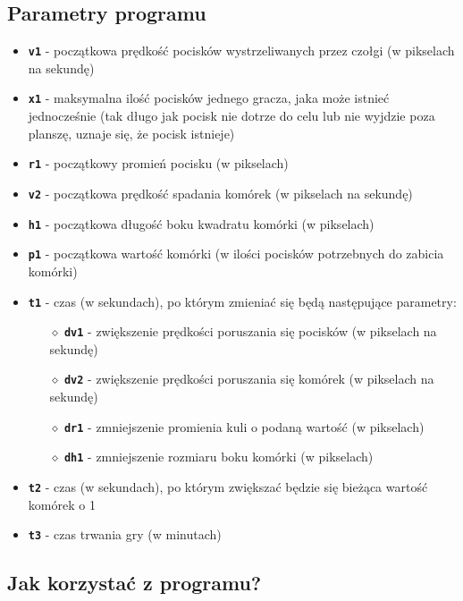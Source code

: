 \documentclass[a4paper]{article}
\begin{document}
\subsection{Parametry programu}
\begin{itemize}
    \item \texttt{\textbf{v1}} - pocz\k{a}tkowa pr\k{e}dko\'s\'c pocisk\'ow wystrzeliwanych przez czo\l{}gi (w pikselach na sekund\k{e})
    \item \texttt{\textbf{x1}} - maksymalna ilość pocisk\'ow jednego gracza, jaka mo\.ze istnie\'c jednocze\'snie (tak długo jak pocisk nie dotrze do celu lub nie wyjdzie poza planszę, uznaje się, że pocisk istnieje)
    \item \texttt{\textbf{r1}} - pocz\k{a}tkowy promie\'n pocisku (w pikselach)
    \item \texttt{\textbf{v2}} - pocz\k{a}tkowa prędko\'s\'c spadania kom\'orek (w pikselach na sekund\k{e})
    \item \texttt{\textbf{h1}} - pocz\k{a}tkowa długo\'s\'c boku kwadratu kom\'orki (w pikselach)
    \item \texttt{\textbf{p1}} - pocz\k{a}tkowa warto\'s\'c kom\'orki (w ilo\'sci pocisk\'ow potrzebnych do zabicia kom\'orki)
    \item \texttt{\textbf{t1}} - czas (w sekundach), po kt\'orym zmienia\'c si\k{e} b\k{e}d\k{a} nast\k{e}puj\k{a}ce parametry:
    \begin{itemize}
        \item[$\diamond$] \texttt{\textbf{dv1}} - zwi\k{e}kszenie pr\k{e}dko\'sci poruszania si\k{e} pocisk\'ow (w pikselach na sekund\k{e})
        \item[$\diamond$] \texttt{\textbf{dv2}} - zwi\k{e}kszenie pr\k{e}dko\'sci poruszania si\k{e} kom\'orek (w pikselach na sekund\k{e}) 
        \item[$\diamond$] \texttt{\textbf{dr1}} - zmniejszenie promienia kuli o podan\k{a} warto\'s\'c (w pikselach)
        \item[$\diamond$] \texttt{\textbf{dh1}} - zmniejszenie rozmiaru boku kom\'orki (w pikselach)
    \end{itemize}
    \item \texttt{\textbf{t2}} - czas (w sekundach), po kt\'orym zwi\k{e}ksza\'c b\k{e}dzie si\k{e} bie\.z\k{a}ca warto\'s\'c kom\'orek o 1
    \item \texttt{\textbf{t3}} - czas trwania gry (w minutach)
\end{itemize}

\subsection{Jak korzysta\'c z programu?}
\end{document}
